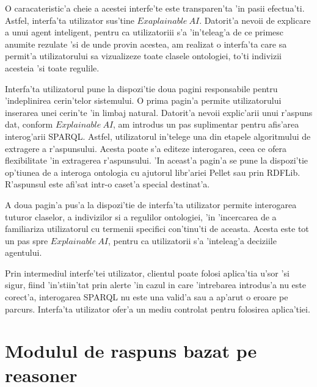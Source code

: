 \documentclass[12pt,a4paper,twoside]{report}
\begin{document}
O caracateristic'a cheie a acestei interfe'te este transparen'ta 'in pasii efectua'ti. Astfel, interfa'ta utilizator sus'tine $Exaplainable\ AI$. Datorit'a nevoii de explicare a unui agent inteligent, pentru ca utilizatoriii s'a 'in'teleag'a de ce primesc anumite rezulate 'si de unde provin acestea, am realizat o interfa'ta care sa permit'a utilizatorului sa vizualizeze toate clasele ontologiei, to'ti indivizii acesteia 'si toate regulile.

Interfa'ta utilizatorul pune la dispozi'tie doua pagini responsabile pentru 'indeplinirea cerin'telor sistemului. O prima pagin'a permite utilizatorului inserarea unei cerin'te 'in limbaj natural. Datorit'a nevoii explic'arii unui r'aspuns dat, conform $Explainable\ AI$, am introdus un pas suplimentar pentru afis'area interog'arii SPARQL. Astfel, utilizatorul in'telege una din etapele algoritmului de extragere a r'aspunsului. Acesta poate s'a editeze interogarea, ceea ce ofera flexibilitate 'in extragerea r'aspunsului. 'In aceast'a pagin'a se pune la dispozi'tie op'tiunea de a interoga ontologia cu ajutorul libr'ariei Pellet sau prin RDFLib. R'aspunsul este afi'sat intr-o caset'a special destinat'a.

A doua pagin'a pus'a la dispozi'tie de interfa'ta utilizator permite interogarea tuturor claselor, a indivizilor si a regulilor ontologiei, 'in 'incercarea de a familiariza utilizatorul cu termenii specifici con'tinu'ti de aceasta. Acesta este tot un pas spre $Explainable\ AI$, pentru ca utilizatorii s'a 'inteleag'a deciziile agentului.

Prin intermediul interfe'tei utilizator, clientul poate folosi aplica'tia u'sor 'si sigur, fiind 'in'stiin'tat prin alerte 'in cazul in care 'intrebarea introdus'a nu este corect'a, interogarea SPARQL nu este una valid'a sau a ap'arut o eroare pe parcurs. Interfa'ta utilizator ofer'a un mediu controlat pentru folosirea aplica'tiei.

\section{Modulul de raspuns bazat pe reasoner}
\end{document}
